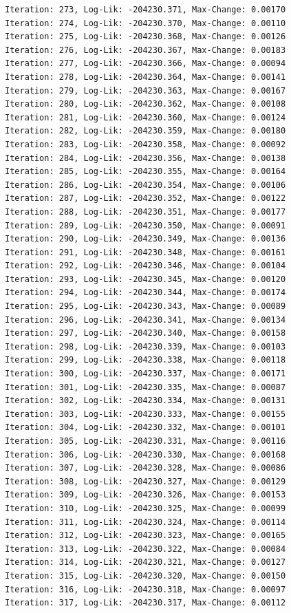 \documentclass[
  letterpaper,
  DIV=11,
  numbers=noendperiod]{scrreport}
\begin{document}
\begin{verbatim}
Iteration: 273, Log-Lik: -204230.371, Max-Change: 0.00170
Iteration: 274, Log-Lik: -204230.370, Max-Change: 0.00110
Iteration: 275, Log-Lik: -204230.368, Max-Change: 0.00126
Iteration: 276, Log-Lik: -204230.367, Max-Change: 0.00183
Iteration: 277, Log-Lik: -204230.366, Max-Change: 0.00094
Iteration: 278, Log-Lik: -204230.364, Max-Change: 0.00141
Iteration: 279, Log-Lik: -204230.363, Max-Change: 0.00167
Iteration: 280, Log-Lik: -204230.362, Max-Change: 0.00108
Iteration: 281, Log-Lik: -204230.360, Max-Change: 0.00124
Iteration: 282, Log-Lik: -204230.359, Max-Change: 0.00180
Iteration: 283, Log-Lik: -204230.358, Max-Change: 0.00092
Iteration: 284, Log-Lik: -204230.356, Max-Change: 0.00138
Iteration: 285, Log-Lik: -204230.355, Max-Change: 0.00164
Iteration: 286, Log-Lik: -204230.354, Max-Change: 0.00106
Iteration: 287, Log-Lik: -204230.352, Max-Change: 0.00122
Iteration: 288, Log-Lik: -204230.351, Max-Change: 0.00177
Iteration: 289, Log-Lik: -204230.350, Max-Change: 0.00091
Iteration: 290, Log-Lik: -204230.349, Max-Change: 0.00136
Iteration: 291, Log-Lik: -204230.348, Max-Change: 0.00161
Iteration: 292, Log-Lik: -204230.346, Max-Change: 0.00104
Iteration: 293, Log-Lik: -204230.345, Max-Change: 0.00120
Iteration: 294, Log-Lik: -204230.344, Max-Change: 0.00174
Iteration: 295, Log-Lik: -204230.343, Max-Change: 0.00089
Iteration: 296, Log-Lik: -204230.341, Max-Change: 0.00134
Iteration: 297, Log-Lik: -204230.340, Max-Change: 0.00158
Iteration: 298, Log-Lik: -204230.339, Max-Change: 0.00103
Iteration: 299, Log-Lik: -204230.338, Max-Change: 0.00118
Iteration: 300, Log-Lik: -204230.337, Max-Change: 0.00171
Iteration: 301, Log-Lik: -204230.335, Max-Change: 0.00087
Iteration: 302, Log-Lik: -204230.334, Max-Change: 0.00131
Iteration: 303, Log-Lik: -204230.333, Max-Change: 0.00155
Iteration: 304, Log-Lik: -204230.332, Max-Change: 0.00101
Iteration: 305, Log-Lik: -204230.331, Max-Change: 0.00116
Iteration: 306, Log-Lik: -204230.330, Max-Change: 0.00168
Iteration: 307, Log-Lik: -204230.328, Max-Change: 0.00086
Iteration: 308, Log-Lik: -204230.327, Max-Change: 0.00129
Iteration: 309, Log-Lik: -204230.326, Max-Change: 0.00153
Iteration: 310, Log-Lik: -204230.325, Max-Change: 0.00099
Iteration: 311, Log-Lik: -204230.324, Max-Change: 0.00114
Iteration: 312, Log-Lik: -204230.323, Max-Change: 0.00165
Iteration: 313, Log-Lik: -204230.322, Max-Change: 0.00084
Iteration: 314, Log-Lik: -204230.321, Max-Change: 0.00127
Iteration: 315, Log-Lik: -204230.320, Max-Change: 0.00150
Iteration: 316, Log-Lik: -204230.318, Max-Change: 0.00097
Iteration: 317, Log-Lik: -204230.317, Max-Change: 0.00112

\end{verbatim}
\end{document}
